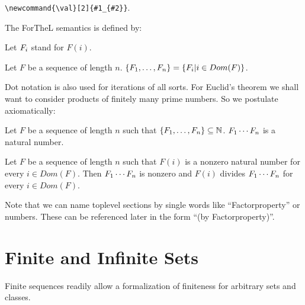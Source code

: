 \documentclass[11pt]{article}
\begin{document}
\verb+\newcommand{\val}[2]{#1_{#2}}+.

\noindent The ForTheL semantics is defined by:

\begin{forthel}
Let $\val{F}{i}$ stand for $F(i)$.

\begin{definition} Let $F$ be a sequence of length $n$.
$\Set{F}{1}{n} = \{ \val{F}{i} | i \in Dom(F)\}$.
\end{definition}

\end{forthel}

Dot notation is also used for iterations of all sorts.
For Euclid's theorem we shall want to consider products
of finitely many prime numbers. So we postulate
axiomatically:

\begin{forthel}



\begin{signature} Let $F$ be a sequence of length $n$
such that $\{F_{1},\dots,F_{n}\} \subseteq \mathbb{N}$.
$F_{1} \cdots F_{n}$ is a natural number.
\end{signature}

\begin{axiom}[Factorproperty] Let $F$ be a sequence of length $n$
such that $F(i)$ is a nonzero natural number for every $i \in Dom(F)$.
Then $F_{1} \cdots F_{n}$ is nonzero and
$F(i)$ divides $F_{1} \cdots F_{n}$ for every $i \in Dom(F)$.
\end{axiom}


\end{forthel}

Note that we can name toplevel sections by single words like ``Factorproperty''
or numbers. These can be referenced later in the form ``(by Factorproperty)''.

\section{Finite and Infinite Sets}

Finite sequences readily allow a formalization
of finiteness for arbitrary sets and classes.
\end{document}
